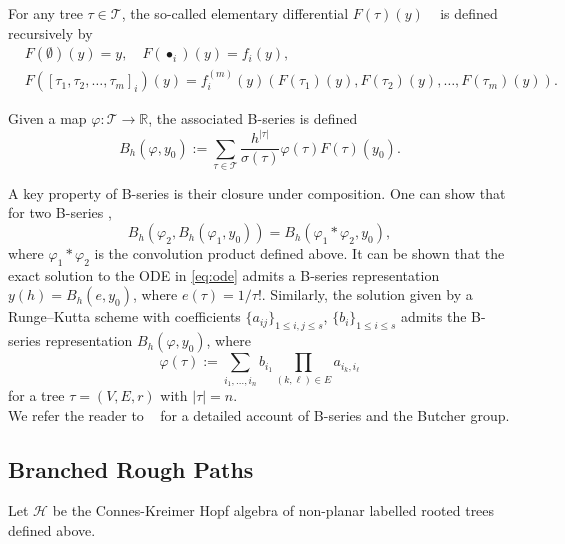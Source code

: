 \documentclass{article} %
\theoremstyle{definition}
\theoremstyle{remark}
\begin{document}
For any tree $\tau \in \mathcal{T}$, the so-called elementary differential $F(\tau)(y)$ ~\citep{butcher2016numerical} is defined recursively by
\begin{align*}
    &F(\emptyset)(y) = y, \quad F(\bullet_i)(y) = f_i(y),\\
    &F([\tau_1, \tau_2, \ldots, \tau_m]_i)(y) = f^{(m)}_i(y)(F(\tau_1)(y), F(\tau_2)(y), \ldots, F(\tau_m)(y)).
\end{align*}

Given a map $\varphi: \mathcal{T} \to \mathbb{R}$, the associated B-series is defined
\begin{equation*}
    B_h(\varphi, y_0) := \sum_{\tau \in \mathcal{T}} \frac{h^{|\tau|}}{\sigma(\tau)} \varphi(\tau) F(\tau)(y_0).
\end{equation*}

A key property of B-series is their closure under composition. One can show that for two B-series \cite{hairer1974butcher, butcher2024b},
\begin{equation*}
    B_h(\varphi_2, B_h(\varphi_1, y_0)) = B_h(\varphi_1 * \varphi_2, y_0),
\end{equation*}
where $\varphi_1 * \varphi_2$ is the convolution product defined above. It can be shown that the exact solution to the ODE in \eqref{eq:ode} admits a B-series representation $y(h) = B_h(e, y_0)$, where $e(\tau) = 1 / \tau!$. Similarly, the solution given by a Runge--Kutta scheme with coefficients $\{a_{ij}\}_{1 \leq i,j \leq s}$, $\{b_i\}_{1 \leq i \leq s}$ admits the B-series representation $B_h(\varphi, y_0)$, where \cite[Lemma 312B]{butcher2016numerical}
\begin{equation*}
    \varphi(\tau) := \sum_{i_1, \ldots, i_n} b_{i_1} \prod_{(k,\ell) \in E} a_{i_k, i_\ell}
\end{equation*}
for a tree $\tau = (V,E,r)$ with $|\tau| = n$.\\

We refer the reader to ~\citep{hairer2006geometric,mclachlan2015butcher,butcher2021b} for a detailed account of B-series and the Butcher group.


\subsection{Branched Rough Paths}\label{appendix:branched_rp}

Let $\mathcal{H}$ be the Connes-Kreimer Hopf algebra of non-planar labelled rooted trees defined above.
\end{document}
